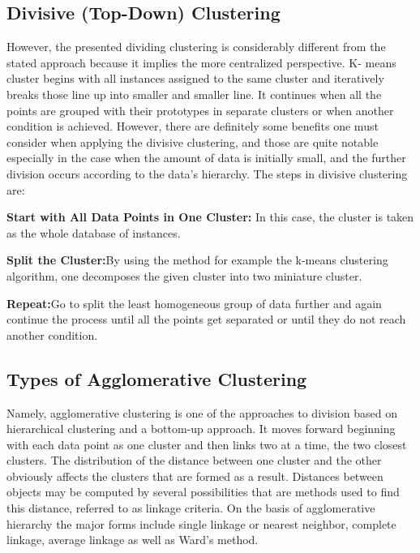 \documentclass[conference]{IEEEtran}
\begin{document}
\subsection{Divisive (Top-Down) Clustering}
However, the presented dividing clustering is considerably different from the stated approach because it implies the more centralized perspective. K- means cluster begins with all instances assigned to the same cluster and iteratively breaks those line up into smaller and smaller line. It continues when all the points are grouped with their prototypes in separate clusters or when another condition is achieved. However, there are definitely some benefits one must consider when applying the divisive clustering, and those are quite notable especially in the case when the amount of data is initially small, and the further division occurs according to the data’s hierarchy. The steps in divisive clustering are:

\textbf{Start with All Data Points in One Cluster: }In this case, the cluster is taken as the whole database of instances.

\textbf{Split the Cluster:}By using the method for example the k-means clustering algorithm, one decomposes the given cluster into two miniature cluster.

\textbf{Repeat:}Go to split the least homogeneous group of data further and again continue the process until all the points get separated or until they do not reach another condition.

 \subsection{Types of Agglomerative Clustering
}Namely, agglomerative clustering is one of the approaches to division based on hierarchical clustering and a bottom-up approach. It moves forward beginning with each data point as one cluster and then links two at a time, the two closest clusters. The distribution of the distance between one cluster and the other obviously affects the clusters that are formed as a result. Distances between objects may be computed by several possibilities that are methods used to find this distance, referred to as linkage criteria. On the basis of agglomerative hierarchy the major forms include single linkage or nearest neighbor, complete linkage, average linkage as well as Ward's method.\cite{xu2005survey}\cite{roux2018comparative}
\end{document}
